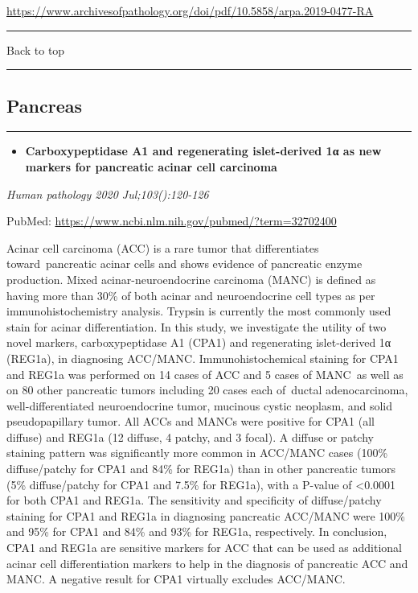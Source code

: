 \documentclass[
]{article}
\providecommand{\tightlist}{%
  \setlength{\itemsep}{0pt}\setlength{\parskip}{0pt}}
\begin{document}
\url{https://www.archivesofpathology.org/doi/pdf/10.5858/arpa.2019-0477-RA}

\begin{center}\rule{0.5\linewidth}{0.5pt}\end{center}

Back to top

\begin{center}\rule{0.5\linewidth}{0.5pt}\end{center}

\pagebreak

\hypertarget{pancreas}{%
\subsection{Pancreas}\label{pancreas}}

\begin{center}\rule{0.5\linewidth}{0.5pt}\end{center}

\begin{itemize}
\tightlist
\item
  \textbf{Carboxypeptidase A1 and regenerating islet-derived 1α as new
  markers for pancreatic acinar cell carcinoma}
\end{itemize}

\emph{Human pathology 2020 Jul;103():120-126}

PubMed: \url{https://www.ncbi.nlm.nih.gov/pubmed/?term=32702400}

Acinar cell carcinoma (ACC) is a rare tumor that differentiates
toward~pancreatic acinar cells and shows evidence of pancreatic enzyme
production. Mixed acinar-neuroendocrine carcinoma (MANC) is defined as
having more than 30\% of both acinar and neuroendocrine cell types as
per immunohistochemistry analysis. Trypsin is currently the most
commonly used stain for acinar differentiation. In this study, we
investigate the utility of two novel markers, carboxypeptidase A1 (CPA1)
and regenerating islet-derived 1α (REG1a), in diagnosing ACC/MANC.
Immunohistochemical staining for CPA1 and REG1a was performed on 14
cases of ACC and 5 cases of MANC~as well as on 80 other pancreatic
tumors including 20 cases each of~ductal adenocarcinoma,
well-differentiated neuroendocrine tumor, mucinous cystic neoplasm, and
solid pseudopapillary tumor. All ACCs and MANCs were positive for CPA1
(all diffuse) and REG1a (12 diffuse, 4 patchy, and 3 focal). A diffuse
or patchy staining pattern was significantly more common in ACC/MANC
cases (100\% diffuse/patchy for CPA1 and 84\% for REG1a) than in other
pancreatic tumors (5\% diffuse/patchy for CPA1 and 7.5\% for REG1a),
with a P-value of \textless0.0001 for both CPA1 and REG1a. The
sensitivity and specificity of diffuse/patchy staining for CPA1 and
REG1a in diagnosing pancreatic ACC/MANC were 100\% and 95\% for CPA1 and
84\% and 93\% for REG1a, respectively. In conclusion, CPA1 and REG1a are
sensitive markers for ACC that can be used as additional acinar cell
differentiation markers to help in the diagnosis of pancreatic ACC and
MANC. A negative result for CPA1 virtually excludes ACC/MANC.
\end{document}
